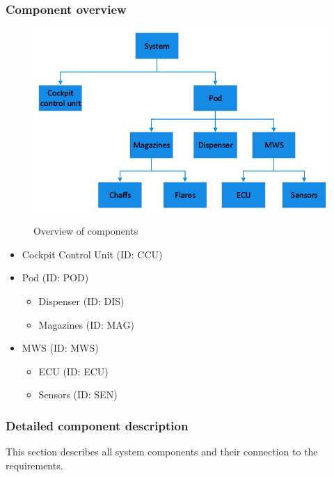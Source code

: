 \subsubsection{Component overview}
\begin{figure}[h]
\centering
\includegraphics[scale=0.5]{./images/hierarchical.png}\\
\caption{Overview of components}
\label{fig:Component_overview}
\end{figure}

\begin{itemize}
\item Cockpit Control Unit (ID: CCU) 
\item Pod (ID: POD)
	\begin{itemize}
	\item Dispenser (ID: DIS)
	\item Magazines (ID: MAG)
	\end{itemize}
\end{itemize}
\begin{itemize}
\item MWS (ID: MWS)
	\begin{itemize}
	\item ECU (ID: ECU)
	\item Sensors (ID: SEN)
	\end{itemize}
\end{itemize}

\subsubsection{Detailed component description}
This section describes all system components and their connection to the requirements.

